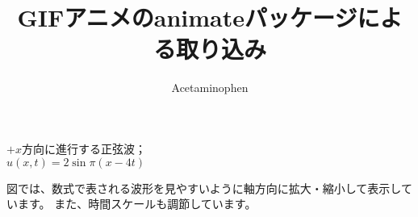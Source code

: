 \documentclass{jarticle}
\title{GIFアニメのanimateパッケージによる取り込み}
\author{Acetaminophen}
\begin{document}
\maketitle

$+x$方向に進行する正弦波； \\ \qquad
$u(x,t) = 2 \sin \pi (x - 4t)$
\begin{figure}[ht]
\centering
{}
\end{figure}

図では、数式で表される波形を見やすいように軸方向に拡大・縮小して表示しています。
また、時間スケールも調節しています。
\end{document}
